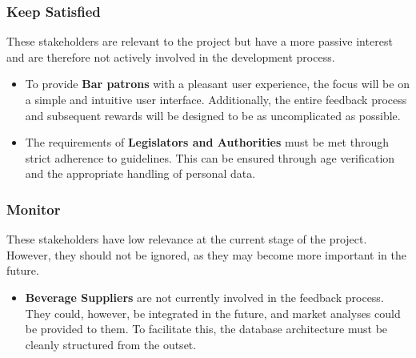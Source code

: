 \documentclass[a4paper,12pt]{article}
\begin{document}
\subsubsection{Keep Satisfied}
These stakeholders are relevant to the project but have a more passive interest and are therefore not actively involved in the development process.

\begin{itemize}
	\item To provide \textbf{Bar patrons} with a pleasant user experience, the focus will be on a simple and intuitive user interface.
	      Additionally, the entire feedback process and subsequent rewards will be designed to be as uncomplicated as possible.
	\item The requirements of \textbf{Legislators and Authorities} must be met through strict adherence to guidelines.
	      This can be ensured through age verification and the appropriate handling of personal data.
\end{itemize}

\subsubsection{Monitor}
These stakeholders have low relevance at the current stage of the project. However, they should not be ignored, as they may become more important in the future.

\begin{itemize}
	\item \textbf{Beverage Suppliers} are not currently involved in the feedback process.
	      They could, however, be integrated in the future, and market analyses could be provided to them.
	      To facilitate this, the database architecture must be cleanly structured from the outset.
\end{itemize}
\end{document}
